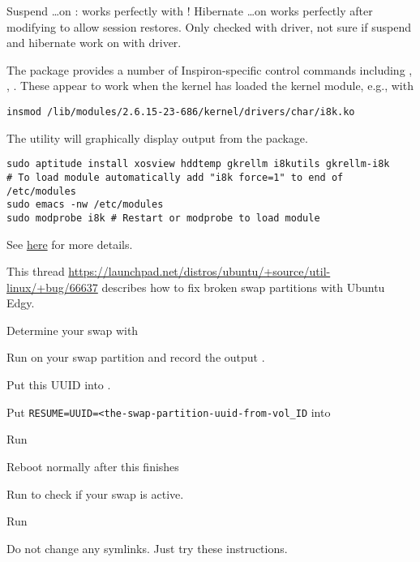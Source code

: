 \documentclass[12pt,twoside]{article}
\begin{document}
Suspend \ldots on : works perfectly with
! 
Hibernate \ldots on  works perfectly after modifying
 to allow session restores.
Only checked  with  driver, not sure if
suspend and hibernate work on  with  driver.

The  package provides a number of Inspiron-specific 
control commands including , ,
. 
These appear to work when the kernel has loaded the 
kernel module, e.g., with 
\begin{verbatim}
insmod /lib/modules/2.6.15-23-686/kernel/drivers/char/i8k.ko
\end{verbatim}

The  utility will graphically display output from
the  package.
\begin{verbatim}
sudo aptitude install xosview hddtemp gkrellm i8kutils gkrellm-i8k
# To load module automatically add "i8k force=1" to end of /etc/modules
sudo emacs -nw /etc/modules
sudo modprobe i8k # Restart or modprobe to load module
\end{verbatim}
See
\href{http://ubuntuguide.org/wiki/Ubuntu:Feisty_ja/Hardware#How_to_monitor_CPU.2C_GPU_temperatures.2C_fan_speeds_and_voltages_.28GKrellM.29}{here}
for more details.

This thread
\url{https://launchpad.net/distros/ubuntu/+source/util-linux/+bug/66637} 
describes how to fix broken swap partitions with Ubuntu Edgy.
\begin{enumerate*}
\item Determine your swap with 
\item Run  on your swap partition and record the output .
\item Put this UUID into .
\item Put \texttt{RESUME=UUID=<the-swap-partition-uuid-from-vol\_ID} into 
\item Run 
\item Reboot normally after this finishes
\item Run  to check if your swap is active.
\item Run 
\end{enumerate*}
Do not change any symlinks. Just try these instructions.
\end{document}
